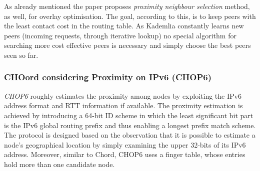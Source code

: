 As already mentioned the paper
proposes \emph{proximity neighbour selection} method, as well, for overlay
optimisation. The goal, according to this, is to keep peers with the least
contact cost in the routing table. As Kademlia constantly learns new peers
(incoming requests, through iterative lookup) no special algorithm for
searching more cost effective peers is necessary and simply choose the best
peers seen so far.

\subsubsection{CHOord considering Proximity on IPv6 (CHOP6)}
\emph{CHOP6} \cite{morimoto_chop6_2007} roughly estimates the proximity among
nodes by exploiting the IPv6 address format and RTT information if available.
The proximity estimation is achieved by introducing a 64-bit ID scheme in which
the least significant bit part is the IPv6 global routing prefix and thus
enabling a longest prefix match scheme. The protocol is designed based on the
observation that it is possible to estimate a node's geographical location by
simply examining the upper 32-bits of its IPv6 address. Moreover, similar to
Chord, CHOP6 uses a finger table, whose entries hold more than
one candidate node.

%
%

